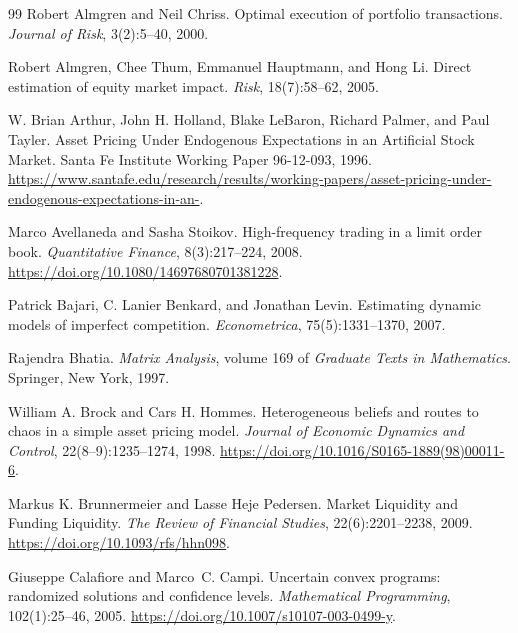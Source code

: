 \documentclass[10pt,twocolumn,letterpaper]{article}
\theoremstyle{definition}
\theoremstyle{remark}
\begin{document}
\begingroup
\small
\setlength{\bibsep}{2pt}
\begin{thebibliography}{99}
Robert Almgren and Neil Chriss.
\newblock Optimal execution of portfolio transactions.
\newblock \emph{Journal of Risk}, 3(2):5--40, 2000.

Robert Almgren, Chee Thum, Emmanuel Hauptmann, and Hong Li.
\newblock Direct estimation of equity market impact.
\newblock \emph{Risk}, 18(7):58--62, 2005.

W. Brian Arthur, John H. Holland, Blake LeBaron, Richard Palmer, and Paul Tayler.
\newblock Asset Pricing Under Endogenous Expectations in an Artificial Stock Market.
\newblock Santa Fe Institute Working Paper 96-12-093, 1996.
\newblock \url{https://www.santafe.edu/research/results/working-papers/asset-pricing-under-endogenous-expectations-in-an-}.

Marco Avellaneda and Sasha Stoikov.
\newblock High-frequency trading in a limit order book.
\newblock \emph{Quantitative Finance}, 8(3):217--224, 2008.
\newblock \url{https://doi.org/10.1080/14697680701381228}.

Patrick Bajari, C. Lanier Benkard, and Jonathan Levin.
\newblock Estimating dynamic models of imperfect competition.
\newblock \emph{Econometrica}, 75(5):1331--1370, 2007.

Rajendra Bhatia.
\newblock \emph{Matrix Analysis}, volume 169 of \emph{Graduate Texts in Mathematics}.
\newblock Springer, New York, 1997.

William A. Brock and Cars H. Hommes.
\newblock Heterogeneous beliefs and routes to chaos in a simple asset pricing model.
\newblock \emph{Journal of Economic Dynamics and Control}, 22(8--9):1235--1274, 1998.
\newblock \url{https://doi.org/10.1016/S0165-1889(98)00011-6}.

Markus K. Brunnermeier and Lasse Heje Pedersen.
\newblock Market Liquidity and Funding Liquidity.
\newblock \emph{The Review of Financial Studies}, 22(6):2201--2238, 2009.
\newblock \url{https://doi.org/10.1093/rfs/hhn098}.

Giuseppe Calafiore and Marco~C. Campi.
\newblock Uncertain convex programs: randomized solutions and confidence levels.
\newblock \emph{Mathematical Programming}, 102(1):25--46, 2005.
\newblock \url{https://doi.org/10.1007/s10107-003-0499-y}.


\end{thebibliography}
\end{document}
